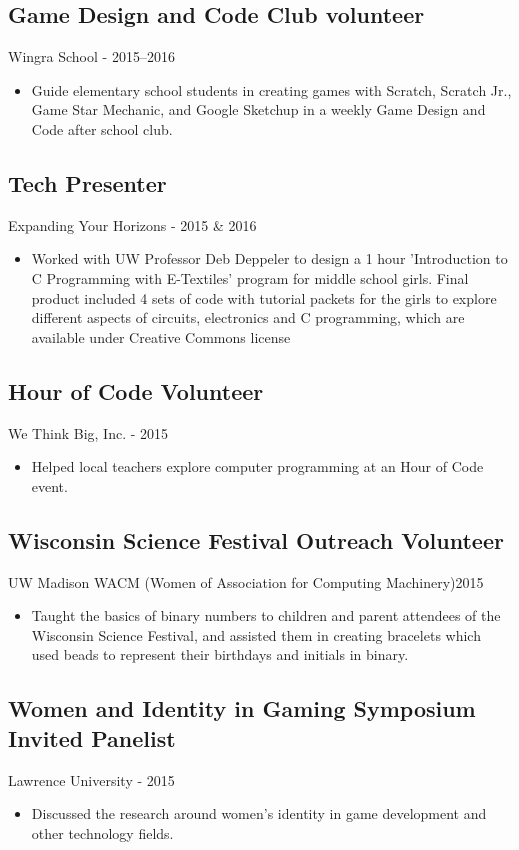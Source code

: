 \documentclass[../main.tex]{subfiles}
\begin{document}
\subsection*{Game Design and Code Club volunteer}
     Wingra School - 2015--2016
\begin{itemize}
		\item{Guide elementary school students in creating games with Scratch, Scratch Jr., Game Star Mechanic, and Google Sketchup in a weekly Game Design and Code after school club.}
	\end{itemize}

\subsection*{Tech Presenter}
     Expanding Your Horizons - 2015 \& 2016
\begin{itemize}
		\item{Worked with UW Professor Deb Deppeler to design a 1 hour 'Introduction to C Programming with E-Textiles' program for middle school girls. Final product included 4 sets of code with tutorial packets for the girls to explore different aspects of circuits, electronics and C programming, which are available under Creative Commons license}
	\end{itemize}


\subsection*{Hour of Code Volunteer}
     We Think Big, Inc. - 2015
\begin{itemize}
		\item{Helped local teachers explore computer programming at an Hour of Code event.}
	\end{itemize}

\subsection*{Wisconsin Science Festival Outreach Volunteer}{
UW Madison WACM (Women of Association for Computing Machinery)}{2015}{}
\begin{itemize}
		\item{Taught the basics of binary numbers to children and parent attendees of the Wisconsin Science Festival, and assisted them in creating bracelets which used beads to represent their birthdays and initials in binary.}
	\end{itemize}


\subsection*{Women and Identity in Gaming Symposium Invited Panelist}
     Lawrence University - 2015
\begin{itemize}
		\item{Discussed the research around women's identity in game development and other technology fields.}
	\end{itemize}
\end{document}
